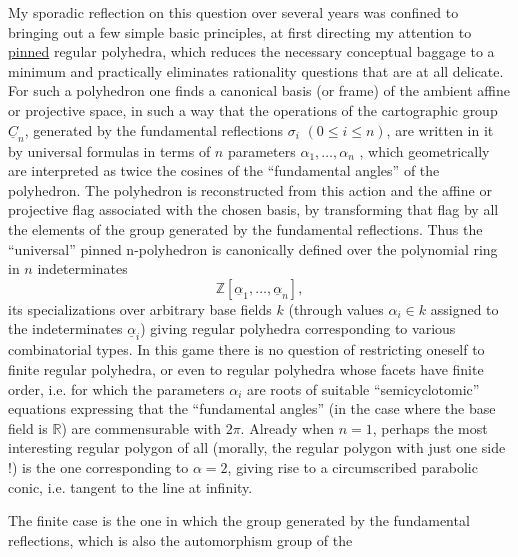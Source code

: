 
My sporadic reflection on this question over several years
was confined to bringing out a few simple basic principles, at
first directing my attention to \uline{pinned} regular
polyhedra,
which reduces the necessary conceptual baggage to a minimum
and practically eliminates rationality questions that are at all
delicate. For such a polyhedron one finds a canonical basis (or
frame) of the ambient affine or projective space, in
such a way that the operations of the cartographic group $\underline{C}_n$, generated
by the fundamental reflections $\sigma_i$ $(0 \leq i \leq n)$, are written in it
by universal formulas in terms of $n$ parameters
$\alpha_1,\ldots,\alpha_n$ , which geometrically are interpreted as twice
the cosines of the ``fundamental angles'' of the polyhedron. The polyhedron
is reconstructed from this action and the affine or
projective flag associated with the chosen basis, by transforming that flag
by all the elements of the group generated by the fundamental
reflections. Thus the ``universal'' pinned n-polyhedron is
canonically defined over the polynomial ring in $n$ indeterminates
\[ \mathbb{Z}[\underline{\alpha}_1,\ldots,\underline{\alpha}_n] , \]
its specializations over arbitrary base fields $k$ (through
values $\alpha_i \in k$ assigned to the indeterminates $\underline{\alpha}_i$) giving
regular polyhedra corresponding to various combinatorial
types. In this game there is no question of restricting oneself to
finite regular polyhedra, or even to regular polyhedra whose
facets have finite order, i.e. for which the parameters
$\alpha_i$ are roots of suitable ``semicyclotomic'' equations
expressing that the ``fundamental angles'' (in the
case where the base field is $\mathbb{R}$) are commensurable with $2\pi$. Already
when $n = 1$, perhaps the most interesting regular polygon
of all (morally, the regular polygon with just one side !)
is the one corresponding to $\alpha = 2$, giving rise to a circumscribed
parabolic conic, i.e. tangent to the line at infinity.

The finite case is the one in which the group generated by the fundamental
reflections, which is also the automorphism group of the


